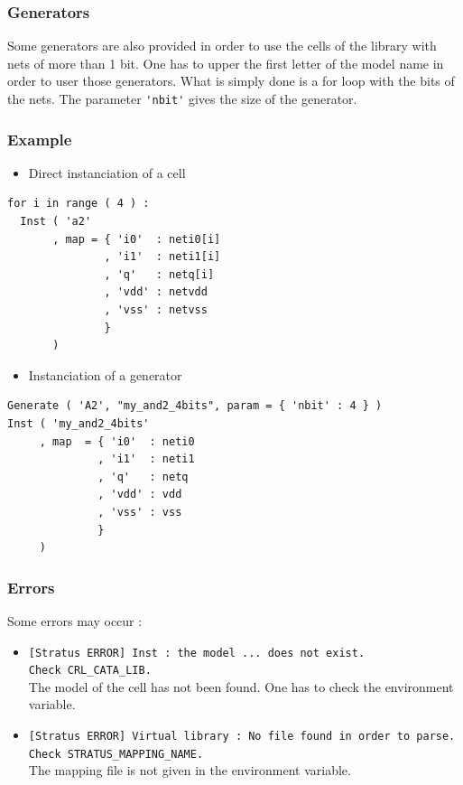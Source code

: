 \subsubsection{Generators}

Some generators are also provided in order to use the cells of the library with nets of more than 1 bit. One has to upper the first letter of the model name in order to user those generators. What is simply done is a for loop with the bits of the nets. The parameter \verb-'nbit'- gives the size of the generator.

\subsubsection{Example}

\begin{itemize}
    \item Direct instanciation of a cell
\end{itemize}
\begin{verbatim}
for i in range ( 4 ) :
  Inst ( 'a2'
       , map = { 'i0'  : neti0[i]
               , 'i1'  : neti1[i]
               , 'q'   : netq[i]
               , 'vdd' : netvdd
               , 'vss' : netvss
               }
       )
\end{verbatim}

\begin{itemize}
    \item Instanciation of a generator
\end{itemize}
\begin{verbatim}
Generate ( 'A2', "my_and2_4bits", param = { 'nbit' : 4 } )
Inst ( 'my_and2_4bits'
     , map  = { 'i0'  : neti0
              , 'i1'  : neti1
              , 'q'   : netq
              , 'vdd' : vdd
              , 'vss' : vss
              }
     )
\end{verbatim}

\subsubsection{Errors}
    
Some errors may occur :
\begin{itemize}
    \item \verb-[Stratus ERROR] Inst : the model ... does not exist.-\\\verb-Check CRL_CATA_LIB.-\\The model of the cell has not been found. One has to check the environment variable.
    \item \verb-[Stratus ERROR] Virtual library : No file found in order to parse.-\\\verb-Check STRATUS_MAPPING_NAME.-\\The mapping file is not given in the environment variable.
\end{itemize} 

\begin{htmlonly}

\end{htmlonly}
